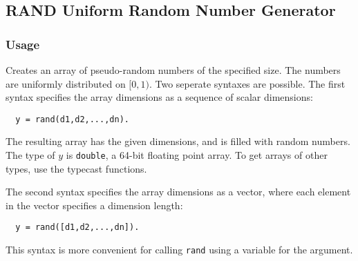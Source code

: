 %
%
%
\subsection{RAND Uniform Random Number Generator}
\subsubsection{Usage}
Creates an array of pseudo-random numbers of the specified size.
The numbers are uniformly distributed on $[0,1)$.  
Two seperate syntaxes are possible.  The first syntax specifies the array 
dimensions as a sequence of scalar dimensions:
\begin{verbatim}
  y = rand(d1,d2,...,dn).
\end{verbatim}
The resulting array has the given dimensions, and is filled with
random numbers.  The type of $y$ is \verb|double|, a 64-bit floating
point array.  To get arrays of other types, use the typecast 
functions.
    
The second syntax specifies the array dimensions as a vector,
where each element in the vector specifies a dimension length:
\begin{verbatim}
  y = rand([d1,d2,...,dn]).
\end{verbatim}
This syntax is more convenient for calling \verb|rand| using a 
variable for the argument.
